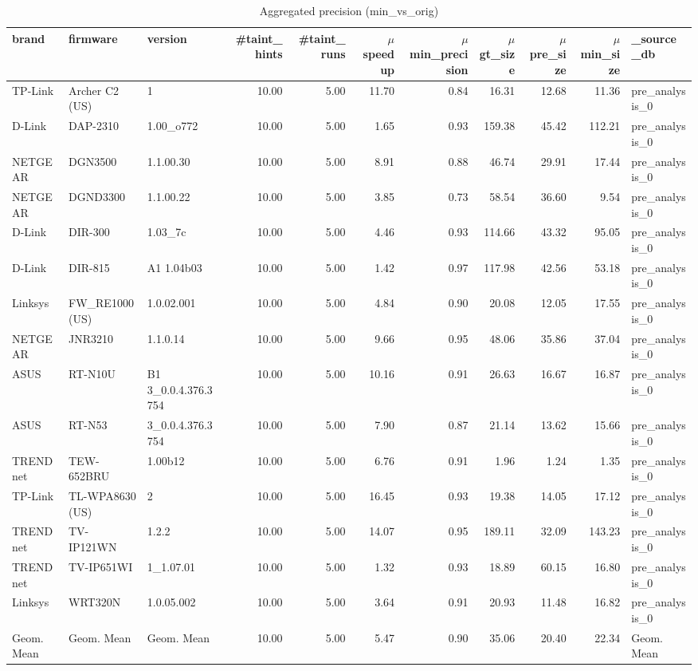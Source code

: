\begin{table}[ht!]
\centering
\footnotesize
\begin{tabular}{| l | l | l | r | r | r | r | r | r | r | l |}
\hline
\textbf{brand} & \textbf{firmware} & \textbf{version} & \textbf{\#taint\_hints} & \textbf{\#taint\_runs} & \textbf{$\mu$speedup} & \textbf{$\mu$min\_precision} & \textbf{$\mu$gt\_size} & \textbf{$\mu$pre\_size} & \textbf{$\mu$min\_size} & \textbf{\_source\_db} \\
\hline
TP-Link & Archer C2 (US) & 1 & 10.00 & 5.00 & 11.70 & 0.84 & 16.31 & 12.68 & 11.36 & pre\_analysis\_0 \\
D-Link & DAP-2310 & 1.00\_o772 & 10.00 & 5.00 & 1.65 & 0.93 & 159.38 & 45.42 & 112.21 & pre\_analysis\_0 \\
NETGEAR & DGN3500 & 1.1.00.30 & 10.00 & 5.00 & 8.91 & 0.88 & 46.74 & 29.91 & 17.44 & pre\_analysis\_0 \\
NETGEAR & DGND3300 & 1.1.00.22 & 10.00 & 5.00 & 3.85 & 0.73 & 58.54 & 36.60 & 9.54 & pre\_analysis\_0 \\
D-Link & DIR-300 & 1.03\_7c & 10.00 & 5.00 & 4.46 & 0.93 & 114.66 & 43.32 & 95.05 & pre\_analysis\_0 \\
D-Link & DIR-815 & A1 1.04b03 & 10.00 & 5.00 & 1.42 & 0.97 & 117.98 & 42.56 & 53.18 & pre\_analysis\_0 \\
Linksys & FW\_RE1000 (US) & 1.0.02.001 & 10.00 & 5.00 & 4.84 & 0.90 & 20.08 & 12.05 & 17.55 & pre\_analysis\_0 \\
NETGEAR & JNR3210 & 1.1.0.14 & 10.00 & 5.00 & 9.66 & 0.95 & 48.06 & 35.86 & 37.04 & pre\_analysis\_0 \\
ASUS & RT-N10U & B1 3\_0.0.4.376.3754 & 10.00 & 5.00 & 10.16 & 0.91 & 26.63 & 16.67 & 16.87 & pre\_analysis\_0 \\
ASUS & RT-N53 & 3\_0.0.4.376.3754 & 10.00 & 5.00 & 7.90 & 0.87 & 21.14 & 13.62 & 15.66 & pre\_analysis\_0 \\
TRENDnet & TEW-652BRU & 1.00b12 & 10.00 & 5.00 & 6.76 & 0.91 & 1.96 & 1.24 & 1.35 & pre\_analysis\_0 \\
TP-Link & TL-WPA8630 (US) & 2 & 10.00 & 5.00 & 16.45 & 0.93 & 19.38 & 14.05 & 17.12 & pre\_analysis\_0 \\
TRENDnet & TV-IP121WN & 1.2.2 & 10.00 & 5.00 & 14.07 & 0.95 & 189.11 & 32.09 & 143.23 & pre\_analysis\_0 \\
TRENDnet & TV-IP651WI & 1\_1.07.01 & 10.00 & 5.00 & 1.32 & 0.93 & 18.89 & 60.15 & 16.80 & pre\_analysis\_0 \\
Linksys & WRT320N & 1.0.05.002 & 10.00 & 5.00 & 3.64 & 0.91 & 20.93 & 11.48 & 16.82 & pre\_analysis\_0 \\
\hline
Geom. Mean & Geom. Mean & Geom. Mean & 10.00 & 5.00 & 5.47 & 0.90 & 35.06 & 20.40 & 22.34 & Geom. Mean \\
\hline
\end{tabular}
\caption{Aggregated precision (min\_vs\_orig)}
\label{tab:agg_results}
\end{table}